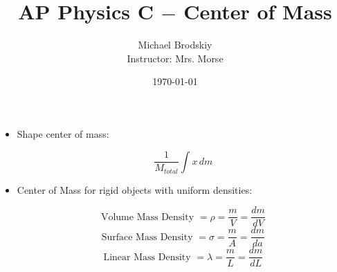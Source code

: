 \documentclass[12pt]{article}
\title{AP Physics C $-$ Center of Mass}
\date{\today}
\author{Michael Brodskiy\\ \small Instructor: Mrs. Morse}
\begin{document}
\maketitle

\begin{itemize}

    \begin{equation}
    \text{Center of Mass }=\sum_i^{\infty} \frac{x_im_i}{M_{total}}\\
      \label{1}
    \end{equation}
    \begin{equation}
      x_{com}=\frac{m_1x_1+m_2x_2+\dots+m_nx_n}{m_1+m_2+\dots+m_n}
      \label{2}
    \end{equation}
    \begin{equation}
      y_{com}=\frac{m_1y_1+m_2y_2+\dots+m_ny_n}{m_1+m_2+\dots+m_n}
      \label{3}
    \end{equation}

  \item Shape center of mass:

    \begin{equation}
      \frac{1}{M_{total}}\int x\,dm
      \label{4}
    \end{equation}

  \item Center of Mass for rigid objects with uniform densities:

    \begin{equation}
      \text{Volume Mass Density } = \rho = \frac{m}{V}=\frac{dm}{dV}
      \label{5}
    \end{equation}
    \begin{equation}
      \text{Surface Mass Density } = \sigma = \frac{m}{A}=\frac{dm}{da}
      \label{6}
    \end{equation}
    \begin{equation}
      \text{Linear Mass Density } = \lambda = \frac{m}{L}=\frac{dm}{dL}
      \label{7}
    \end{equation}

\end{itemize}
\end{document}
